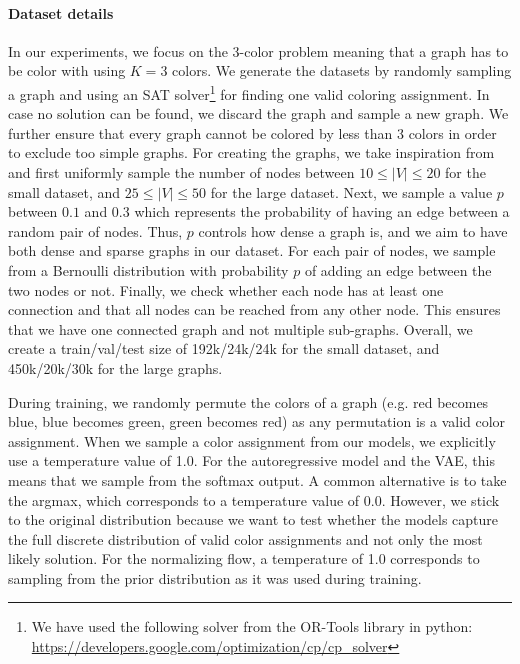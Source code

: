 \paragraph{Dataset details}
In our experiments, we focus on the 3-color problem meaning that a graph has to be color with using $K=3$ colors. We generate the datasets by randomly sampling a graph and using an SAT solver\footnote{We have used the following solver from the OR-Tools library in python: \href{https://developers.google.com/optimization/cp/cp_solver}{https://developers.google.com/optimization/cp/cp\_solver}} for finding one valid coloring assignment. 
In case no solution can be found, we discard the graph and sample a new graph. 
We further ensure that every graph cannot be colored by less than 3 colors in order to exclude too simple graphs. 
For creating the graphs, we take inspiration from \citet{GraphColoringDL} and first uniformly sample the number of nodes between $10\leq|V|\leq20$ for the small dataset, and $25\leq|V|\leq50$ for the large dataset.
Next, we sample a value $p$ between $0.1$ and $0.3$ which represents the probability of having an edge between a random pair of nodes. Thus, $p$ controls how dense a graph is, and we aim to have both dense and sparse graphs in our dataset. 
For each pair of nodes, we sample from a Bernoulli distribution with probability $p$ of adding an edge between the two nodes or not. Finally, we check whether each node has at least one connection and that all nodes can be reached from any other node. This ensures that we have one connected graph and not multiple sub-graphs. 
Overall, we create a train/val/test size of 192k/24k/24k for the small dataset, and 450k/20k/30k for the large graphs. 

During training, we randomly permute the colors of a graph (e.g. red becomes blue, blue becomes green, green becomes red) as any permutation is a valid color assignment. When we sample a color assignment from our models, we explicitly use a temperature value of 1.0. For the autoregressive model and the VAE, this means that we sample from the softmax output. A common alternative is to take the argmax, which corresponds to a temperature value of 0.0. However, we stick to the original distribution because we want to test whether the models capture the full discrete distribution of valid color assignments and not only the most likely solution. For the normalizing flow, a temperature of 1.0 corresponds to sampling from the prior distribution as it was used during training.

